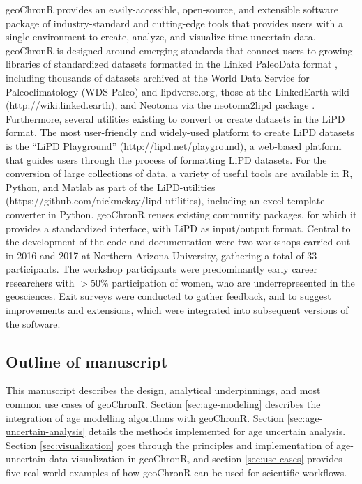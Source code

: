 \documentclass[gchron, manuscript]{copernicus}
\begin{document}
geoChronR provides an easily-accessible, open-source, and extensible software package of industry-standard and cutting-edge tools that provides users with a single environment to create, analyze, and visualize time-uncertain data.
geoChronR is designed around emerging standards that connect users to growing libraries of standardized datasets formatted in the Linked PaleoData format \citep{lipd_cp}, including thousands of datasets archived at the World Data Service for Paleoclimatology (WDS-Paleo) and lipdverse.org, those at the LinkedEarth wiki (http://wiki.linked.earth), and Neotoma \citep{williams2018neotoma} via the neotoma2lipd package \citep{neotoma2lipd}.
Furthermore, several utilities existing to convert or create datasets in the LiPD format.
The most user-friendly and widely-used platform to create LiPD datasets is the ``LiPD Playground'' (http://lipd.net/playground), a web-based platform that guides users through the process of formatting LiPD datasets.
For the conversion of large collections of data, a variety of useful tools are available in R, Python, and Matlab as part of the LiPD-utilities (https://github.com/nickmckay/lipd-utilities), including an excel-template converter in Python.
geoChronR reuses existing community packages, for which it provides a standardized interface, with LiPD as input/output format.
Central to the development of the code and documentation were two workshops carried out in 2016 and 2017 at Northern Arizona University, gathering a total of 33 participants.
The workshop participants were predominantly early career researchers with \(>50\%\) participation of women, who are underrepresented in the geosciences.
Exit surveys were conducted to gather feedback, and to suggest improvements and extensions, which were integrated into subsequent versions of the software.

\subsection{Outline of manuscript}

This manuscript describes the design, analytical underpinnings, and most common use cases of geoChronR.
Section \ref{sec:age-modeling} describes the integration of age modelling algorithms with geoChronR.
Section \ref{sec:age-uncertain-analysis} details the methods implemented for age uncertain analysis.
Section \ref{sec:visualization} goes through the principles and implementation of age-uncertain data visualization in geoChronR, and section \ref{sec:use-cases} provides five real-world examples of how geoChronR can be used for scientific workflows.
\end{document}
